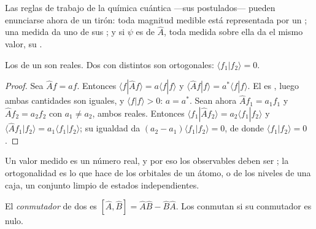 Las reglas de trabajo de la química cuántica ---sus postulados--- pueden enunciarse
ahora de un tirón: toda magnitud medible está representada por un ; una medida da uno de sus ; y si
$\psi$ es  de $\hat A$, toda medida sobre ella da el
mismo valor, su .

\begin{theorem}\label{thm:b3:quantum-model-systems:hermitian-real}
Los  de un  son reales. Dos  con
 distintos son ortogonales: $\langle f_1|f_2\rangle = 0$.
\end{theorem}

\begin{proof}
Sea $\hat Af = af$. Entonces $\langle f|\hat Af\rangle = a\langle f|f\rangle$ y
$\langle\hat Af|f\rangle = a^*\langle f|f\rangle$. El  es ,
luego ambas cantidades son iguales, y $\langle f|f\rangle > 0$: $a = a^*$. Sean ahora $\hat Af_1
= a_1f_1$ y $\hat Af_2 = a_2f_2$ con $a_1 \ne a_2$, ambos reales. Entonces
$\langle f_1|\hat Af_2\rangle = a_2\langle f_1|f_2\rangle$ y $\langle\hat Af_1|
f_2\rangle = a_1\langle f_1|f_2\rangle$; su igualdad da $(a_2 - a_1)
\langle f_1|f_2\rangle = 0$, de donde $\langle f_1|f_2\rangle = 0$.
\end{proof}

Un valor medido es un número real, y por eso los observables deben ser
; la ortogonalidad es lo que hace de los orbitales de un átomo, o de los
niveles de una caja, un conjunto limpio de estados independientes.

\begin{definition}[Conmutador]\label{def:b3:quantum-model-systems:commutator}
El \emph{conmutador} de dos  es $[\hat A,\hat B] =
\hat A\hat B - \hat B\hat A$. Los  conmutan si su conmutador es
nulo.
\end{definition}


